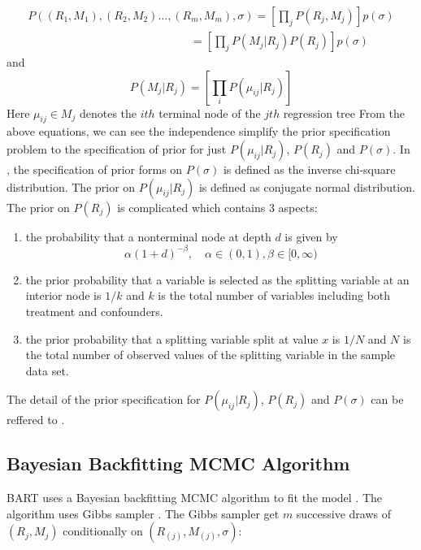 \begin{equation*}
 \begin{array}{l}
P(({R_1},{M_1}),({R_2},{M_2}) \ldots ,({R_m},{M_m}),\sigma ) = \left[ {\prod\limits_j {P({R_j},{M_j})} } \right]p(\sigma )\\
\quad \quad \quad \quad \quad \quad \quad \quad \quad \quad \quad \quad \quad \quad \; = \left[ {\prod\limits_j {P({M_j}|{R_j})P({R_j})} } \right]p(\sigma )
\end{array}
 \end{equation*}
and
\begin{equation*}
P({M_j}|{R_j}) = \left[ {\prod\limits_i {P({\mu _{ij}}|{R_j})} } \right]
 \end{equation*}
Here ${\mu _{ij}} \in {M_j}$ denotes the $ith$ terminal node of the $jth$ regression tree From the above equations, we can see the independence simplify the prior specification problem to the specification of prior for just ${P({\mu _{ij}}|{R_j})}$, $P({R_j})$ and $P(\sigma)$. In \cite{chipman2010bart}, the specification of prior forms on $P(\sigma)$ is defined as the inverse chi-square distribution. The prior on ${P({\mu _{ij}}|{R_j})}$ is defined as conjugate normal distribution. The prior on $P(R_j)$ is complicated which contains 3 aspects:
\begin{enumerate}
\item the probability that a nonterminal node at depth $d$ is given by
\begin{equation*}
\alpha {(1 + d)^{ - \beta }},\quad \alpha  \in (0,1),\beta  \in [0,\infty )
 \end{equation*}
\item the prior probability that a variable is selected as the splitting variable at an interior node is $1/k$ and $k$ is the total number of variables including both treatment and confounders.
\item the prior probability that a splitting variable split at value $x$ is $1/N$ and $N$ is the total number of observed values of the splitting variable in the sample data set.
\end{enumerate}
The detail of the prior specification for ${P({\mu _{ij}}|{R_j})}$, $P({R_j})$ and $P(\sigma)$ can be reffered to \cite{chipman2010bart}.


\subsection{Bayesian Backfitting MCMC Algorithm}
BART uses a Bayesian backfitting  MCMC algorithm to fit the model \cite{gilks2005markov}. The algorithm uses Gibbs sampler \cite{casella1992explaining}. The Gibbs sampler get $m$ successive draws of $(R_j, M_j)$ conditionally on $(R_{(j)}, M_{(j)}, \sigma)$:

